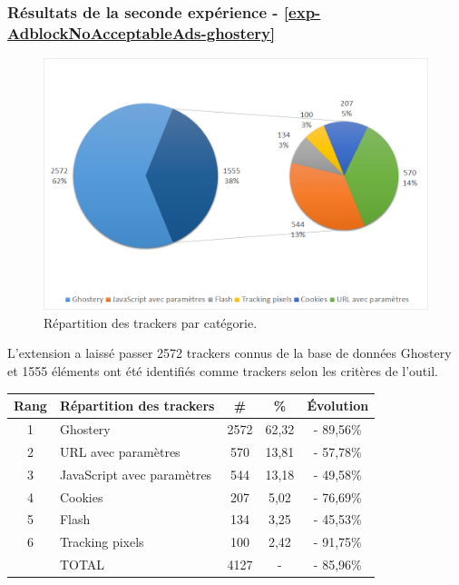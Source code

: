 
\subsubsection{Résultats de la seconde expérience - \autoref{exp-AdblockNoAcceptableAds-ghostery}}
\begin{figure}[!h]
	\centering
	\includegraphics[scale=.6]{resultats/ANALYSES/Images/AdblockNoAcceptableAds-Ghostery.png}
	\caption{\label{exp-AdblockNoAcceptableAds-ghostery}Répartition des trackers par catégorie.}
\end{figure}

L'extension a laissé passer 2572 trackers connus de la base de données Ghostery et 1555 éléments ont été identifiés comme trackers selon les critères de l'outil.\\

\begin{tabular}{ c | p{5cm} | c | c || c | }
   Rang & Répartition des trackers & \# & \% & Évolution \\
   \hline
   \hline
   1 & Ghostery & 2572 & 62,32 & - 89,56\% \\
   2 & URL avec paramètres & 570 & 13,81 & - 57,78\% \\
   3 & JavaScript avec paramètres & 544 & 13,18 & - 49,58\% \\
   4 & Cookies & 207 & 5,02 & - 76,69\% \\
   5 & Flash & 134 & 3,25 & - 45,53\% \\
   6 & Tracking pixels & 100 & 2,42 & - 91,75\% \\
   \hline
    & TOTAL & 4127 & - & - 85,96\%\\
   \hline
\end{tabular}
\\[1cm]

